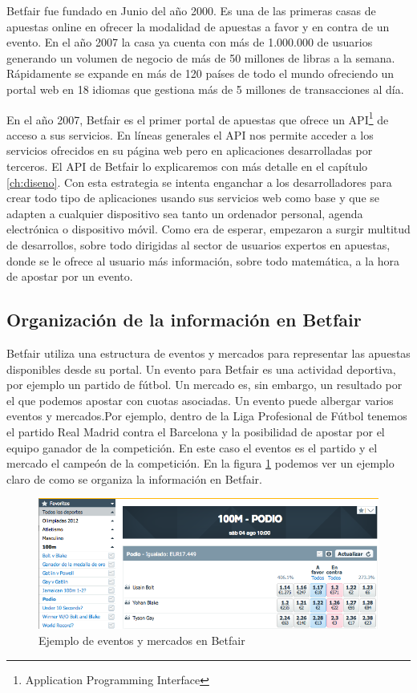  Betfair fue fundado en Junio del año 2000. Es una de las primeras casas de apuestas online en ofrecer la modalidad de apuestas a favor y en contra de un evento. En el año 2007 la casa ya cuenta con más de 1.000.000 de usuarios generando un volumen de negocio de más de 50 millones de libras a la semana. Rápidamente se expande en más de 120 países de todo el mundo ofreciendo un portal web en 18 idiomas que gestiona más de 5 millones de transacciones al día. 

En el año 2007, Betfair es el primer portal de apuestas que ofrece un API\footnote{Application Programming Interface} de acceso a sus servicios. En líneas generales el API nos permite acceder a los servicios ofrecidos en su página web pero en aplicaciones desarrolladas por terceros. El API de Betfair lo explicaremos con más detalle en el capítulo \ref{ch:diseno}. Con esta estrategia se intenta enganchar a los desarrolladores para crear todo tipo de aplicaciones usando sus servicios web como base y que se adapten a cualquier dispositivo sea tanto un ordenador personal, agenda electrónica o dispositivo móvil. Como era de esperar, empezaron a surgir multitud de desarrollos, sobre todo dirigidas al sector de usuarios expertos en apuestas, donde se le ofrece al usuario más información, sobre todo matemática, a la hora de apostar por un evento.

\subsection{Organización de la información en Betfair}

 Betfair utiliza una estructura de eventos y mercados para representar las apuestas disponibles desde su portal. Un evento para Betfair es una actividad deportiva, por ejemplo un partido de fútbol. Un mercado es, sin embargo, un resultado por el que podemos apostar con cuotas asociadas. Un evento puede albergar varios eventos y mercados.Por ejemplo, dentro de la Liga Profesional de Fútbol tenemos el partido Real Madrid contra el Barcelona y la posibilidad de apostar por el equipo ganador de la competición. En este caso el eventos es el partido y el mercado el campeón de la competición. En la figura \ref{fig:eventoymercado} podemos ver un ejemplo claro de como se organiza la información en Betfair.
 
 \begin{figure} [h]
  \centering
    \includegraphics[width=1.1\textwidth]{./images/introbetfair.png} 
  \caption{Ejemplo de eventos y mercados en Betfair}
  \label{fig:eventoymercado}
\end{figure}

